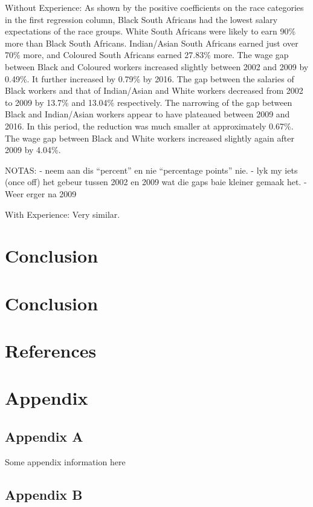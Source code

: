 \documentclass[11pt,preprint, authoryear]{elsarticle}
\numberwithin{equation}{section}
\numberwithin{figure}{section}
\numberwithin{table}{section}
\newlength{\cslhangindent}
\newenvironment{CSLReferences}%
  {\setlength{\parindent}{0pt}%
  \everypar{\setlength{\hangindent}{\cslhangindent}}\ignorespaces}%
  {\par}
\begin{document}
Without Experience: As shown by the positive coefficients on the race
categories in the first regression column, Black South Africans had the
lowest salary expectations of the race groups. White South Africans were
likely to earn 90\% more than Black South Africans. Indian/Asian South
Africans earned just over 70\% more, and Coloured South Africans earned
27.83\% more. The wage gap between Black and Coloured workers increased
slightly between 2002 and 2009 by 0.49\%. It further increased by 0.79\%
by 2016. The gap between the salaries of Black workers and that of
Indian/Asian and White workers decreased from 2002 to 2009 by 13.7\% and
13.04\% respectively. The narrowing of the gap between Black and
Indian/Asian workers appear to have plateaued between 2009 and 2016. In
this period, the reduction was much smaller at approximately 0.67\%. The
wage gap between Black and White workers increased slightly again after
2009 by 4.04\%.

NOTAS: - neem aan dis ``percent'' en nie ``percentage points'' nie. -
lyk my iets (once off) het gebeur tussen 2002 en 2009 wat die gaps baie
kleiner gemaak het. - Weer erger na 2009

With Experience: Very similar.

\hypertarget{conclusion}{%
\section{Conclusion}\label{conclusion}}

\hfill

\hypertarget{conclusion-1}{%
\section{Conclusion}\label{conclusion-1}}

\newpage

\hypertarget{references}{%
\section*{References}\label{references}}

\hypertarget{refs}{}
\begin{CSLReferences}{0}{0}
\end{CSLReferences}

\hypertarget{appendix}{%
\section*{Appendix}\label{appendix}}

\hypertarget{appendix-a}{%
\subsection*{Appendix A}\label{appendix-a}}

Some appendix information here

\hypertarget{appendix-b}{%
\subsection*{Appendix B}\label{appendix-b}}


\end{document}
